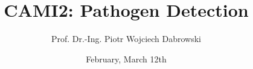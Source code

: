 \usepackage[utf8]{inputenc}
\usepackage[T1]{fontenc}
\usepackage[export]{adjustbox}
\usepackage{amssymb}


\title{CAMI2: Pathogen Detection}
\date{February, March 12th}
\author[PWD]{Prof. Dr.-Ing. Piotr Wojciech Dabrowski}

\usepackage{HTWBeamerTemplate/beamerthemeHTW}
